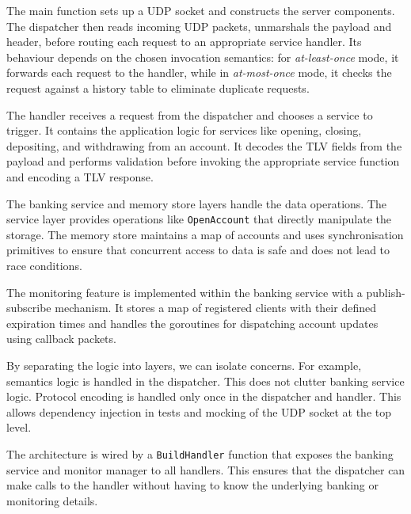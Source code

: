 \documentclass[9pt,a4paper]{article}
\begin{document}
\begin{description}[style=nextline, itemsep=1ex, leftmargin=1em] 
    \item[Main \& Dispatcher:] 
    The main function sets up a UDP socket and constructs the server components. The dispatcher then reads incoming UDP packets, unmarshals the payload and header, before routing each request to an appropriate service handler. Its behaviour depends on the chosen invocation semantics: for \textit{at-least-once} mode, it forwards each request to the handler, while in \textit{at-most-once} mode, it checks the request against a history table to eliminate duplicate requests.
    
    \item[Handler:] 
    The handler receives a request from the dispatcher and chooses a service to trigger. It contains the application logic for services like opening, closing, depositing, and withdrawing from an account. It decodes the TLV fields from the payload and performs validation before invoking the appropriate service function and encoding a TLV response.
    
    \item[Banking Service \& Memory Store:] 
    The banking service and memory store layers handle the data operations. The service layer provides operations like \texttt{OpenAccount} that directly manipulate the storage. The memory store maintains a map of accounts and uses synchronisation primitives to ensure that concurrent access to data is safe and does not lead to race conditions.
    
    \item[Monitor Manager:] 
    The monitoring feature is implemented within the banking service with a publish-subscribe mechanism. It stores a map of registered clients with their defined expiration times and handles the goroutines for dispatching account updates using callback packets.
\end{description}

By separating the logic into layers, we can isolate concerns.
For example, semantics logic is handled in the dispatcher.
This does not clutter banking service logic. 
Protocol encoding is handled only once in the dispatcher and handler. 
This allows dependency injection in tests and mocking of the UDP socket at the top level. 

The architecture is wired by a \texttt{BuildHandler} function that exposes the banking service and monitor manager to all handlers. 
This ensures that the dispatcher can make calls to the handler without having to know the underlying banking or monitoring details.
\end{document}
